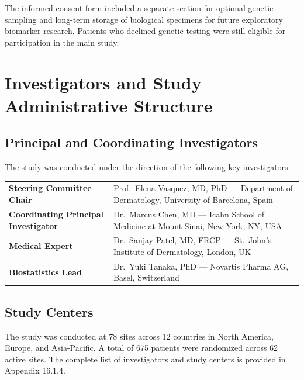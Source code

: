 \documentclass[11pt, a4paper]{article}
\begin{document}
The informed consent form included a separate section for optional genetic sampling and long-term storage of biological specimens for future exploratory biomarker research. Patients who declined genetic testing were still eligible for participation in the main study.

\newpage

\section{Investigators and Study Administrative Structure}

\subsection{Principal and Coordinating Investigators}

The study was conducted under the direction of the following key investigators:

\vspace{4pt}
\renewcommand{\arraystretch}{1.25}
\begin{tabularx}{\linewidth}{@{}>{\color{accent}\bfseries}l@{\hspace{6mm}}X@{}}
Steering Committee Chair           & Prof.\ Elena Vasquez, MD, PhD --- Department of Dermatology, University of Barcelona, Spain \\
Coordinating Principal Investigator & Dr.\ Marcus Chen, MD --- Icahn School of Medicine at Mount Sinai, New York, NY, USA \\
Medical Expert                     & Dr.\ Sanjay Patel, MD, FRCP --- St.\ John's Institute of Dermatology, London, UK \\
Biostatistics Lead                 & Dr.\ Yuki Tanaka, PhD --- Novartis Pharma AG, Basel, Switzerland \\
\end{tabularx}
\renewcommand{\arraystretch}{1.0}
\vspace{4pt}

\subsection{Study Centers}

The study was conducted at 78 sites across 12 countries in North America, Europe, and Asia-Pacific. A total of 675 patients were randomized across 62 active sites. The complete list of investigators and study centers is provided in Appendix 16.1.4.
\end{document}
